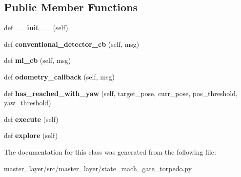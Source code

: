 \subsection*{Public Member Functions}
\begin{DoxyCompactItemize}
\item 
\mbox{\label{classmaster__layer_1_1state__mach__gate__torpedo_1_1FindFrontTarget_a5999bc8b157a7eb9b2046b87ea66f990}} 
def {\bfseries \+\_\+\+\_\+init\+\_\+\+\_\+} (self)
\item 
\mbox{\label{classmaster__layer_1_1state__mach__gate__torpedo_1_1FindFrontTarget_a77c6dc67b18e3f3978dae9c381351896}} 
def {\bfseries conventional\+\_\+detector\+\_\+cb} (self, msg)
\item 
\mbox{\label{classmaster__layer_1_1state__mach__gate__torpedo_1_1FindFrontTarget_a743f11be402bf922c16c0aec04c43e6e}} 
def {\bfseries ml\+\_\+cb} (self, msg)
\item 
\mbox{\label{classmaster__layer_1_1state__mach__gate__torpedo_1_1FindFrontTarget_a2598c83f422342a85fe61e171dab9df2}} 
def {\bfseries odometry\+\_\+callback} (self, msg)
\item 
\mbox{\label{classmaster__layer_1_1state__mach__gate__torpedo_1_1FindFrontTarget_ac034453b57d1d9c8e51d874d0583e25b}} 
def {\bfseries has\+\_\+reached\+\_\+with\+\_\+yaw} (self, target\+\_\+pose, curr\+\_\+pose, pos\+\_\+threshold, yaw\+\_\+threshold)
\item 
\mbox{\label{classmaster__layer_1_1state__mach__gate__torpedo_1_1FindFrontTarget_a6f5ae668a1813a92c70476ed5612e818}} 
def {\bfseries execute} (self)
\item 
\mbox{\label{classmaster__layer_1_1state__mach__gate__torpedo_1_1FindFrontTarget_acd1897be61b181a9949df89f59bc64f4}} 
def {\bfseries explore} (self)
\end{DoxyCompactItemize}


The documentation for this class was generated from the following file\+:\begin{DoxyCompactItemize}
\item 
master\+\_\+layer/src/master\+\_\+layer/state\+\_\+mach\+\_\+gate\+\_\+torpedo.\+py\end{DoxyCompactItemize}
